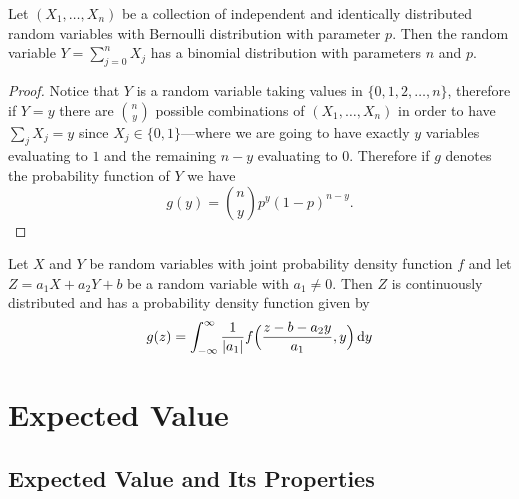 \begin{proposition}
\label{prop:sum-bernoulli-rv-is-binomial}
Let \((X_1, \dots, X_n)\) be a collection of independent and identically
distributed random variables with Bernoulli distribution with parameter
\(p\). Then the random variable \(Y = \sum_{j=0}^n X_j\) has a binomial
distribution with parameters \(n\) and \(p\).
\end{proposition}

\begin{proof}
Notice that \(Y\) is a random variable taking values in
\(\{0, 1, 2, \dots, n\}\), therefore if \(Y = y\) there are \(\binom{n}{y}\)
possible combinations of \((X_1, \dots, X_n)\) in order to have
\(\sum_j X_j = y\) since \(X_j \in \{0, 1\}\)---where we are going to have
exactly \(y\) variables evaluating to \(1\) and the remaining \(n - y\)
evaluating to \(0\). Therefore if \(g\) denotes the probability function of
\(Y\) we have
\[
g(y) = \binom{n}{y} p^y (1 - p)^{n - y}.
\]
\end{proof}

\begin{proposition}
\label{prop:}
Let \(X\) and \(Y\) be random variables with joint probability density function
\(f\) and let \(Z = a_1 X + a_2 Y + b\) be a random variable with \(a_1 \neq
0\). Then \(Z\) is continuously distributed and has a probability density
function given by
\[
g(z) = \int_{-\infty}^{\infty} \frac{1}{|a_1|}
f\Big( \frac{z - b - a_{2}y}{a_1}, y \Big)\, \mathrm{d} y
\]
\end{proposition}

\section{Expected Value}

\subsection{Expected Value and Its Properties}

